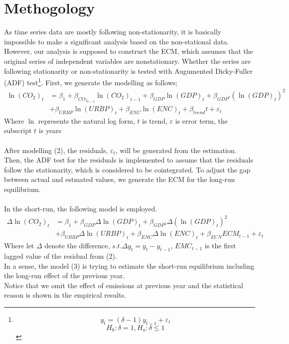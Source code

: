 \documentclass[12pt, a4paper]{article}
\begin{document}
\section{Methogology}
As time series data are mostly following non-stationarity, it is basically impossible to make a significant analysis based on the non-stational data.  However, our analysis is supposed to construct the ECM, which assumes that the original series of independent variables are nonstationary.  Whether the series are following stationarity or non-stationarity is tested with Augumented Dicky-Fuller (ADF) test\footnote{\[y_t=(\delta-1)y_{t-1}+\varepsilon_t\]
$$H_0: \delta=1, H_a:\delta\leq 1$$}. First, we generate the modelling as follows;
\begin{equation}
\begin{split}
\ln{(CO_2)}_{t}&=\beta_1+\beta_{{CO_{2}}_{t-1}}\ln{(CO_2)}_{t-1}+\beta_{GDP}\ln{(GDP)}_{t}+\beta_{GDP^2}(\ln{(GDP)_{t}})^2\\
&+\beta_{URBP}\ln{(URBP)}_{t}+\beta_{ENC}\ln{(ENC)}_{t}+\beta_{trend}t+\varepsilon_{t}
\end{split}
\end{equation}
Where $\ln$ represents the natural log form, $t$ is trend, $\varepsilon$ is error term, the subscript $t$ is years\\
\\
After modelling (2), the residuals, $\varepsilon_{t}$, will be generated from the estimation.   Then, the ADF test for the residuals is implemented to assume that the residuals follow the stationarity, which is considered to be cointegrated.  To adjust the gap between actual and estmated values, we generate the ECM for the long-run equilibrium.\\
\\
In the short-run, the following model is employed.
\begin{equation}
\begin{split}
\varDelta{\ln{(CO_2)}_{t}}&=\beta_1+\beta_{GDP}\varDelta{\ln{(GDP)}_{t}}+\beta_{GDP^2}\varDelta{(\ln{(GDP)_{t}})^2}\\
&+\beta_{URBP}\varDelta{\ln{(URBP)}_{t}}+\beta_{ENC}\varDelta{\ln{(ENC)}_{t}}+\beta_{ECN}ECM_{t-1}+\varepsilon_{t}
\end{split}
\end{equation}
Where let $\varDelta$ denote the difference, $s.t. \varDelta y_t=y_t-y_{t-1}$, $EMC_{t-1}$ is the first lagged value of the residual from (2).\\
In a sense, the model (3) is trying to estimate the short-run equilibrium including the long-run effect of the previous year.\\
Notice that we omit the effect of  emissions at previous year and the statistical reason is shown in the empirical results.  
\end{document}
